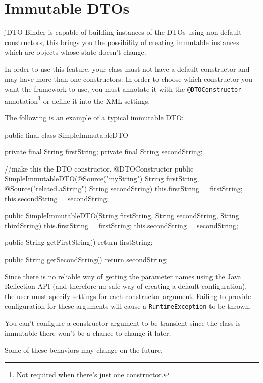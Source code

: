 \documentclass[11pt]{article}
\newcommand{\JDTO}{jDTO Binder\xspace}
\begin{document}
\section{Immutable DTOs}

\JDTO is capable of building instances of the DTOs using non default constructors, this brings you the possibility of creating immutable instances which
 are objects whose state doesn't change.
 
In order to use this feature, your class must not have a default constructor and may have more than one constructors. In order to choose which constructor you want the framework to use, you must annotate it with the \texttt{@DTOConstructor} annotation\footnote{Not required when there's just one constructor.} or define it into the XML settings.

The following is an example of a typical immutable DTO:

\begin{java}
public final class SimpleImmutableDTO {
    private final String firstString;
    private final String secondString;
    
    //make this the DTO constructor.
    @DTOConstructor
    public SimpleImmutableDTO(@Source("myString") String firstString, @Source("related.aString") String secondString) {
        this.firstString = firstString;
        this.secondString = secondString;
    }
    
    public SimpleImmutableDTO(String firstString, String secondString, String thirdString) {
        this.firstString = firstString;
        this.secondString = secondString;
    }
    
    public String getFirstString() {
        return firstString;
    }

    public String getSecondString() {
        return secondString;
    }    
}
\end{java}

Since there is no reliable way of getting the parameter names using the Java Reflection API (and therefore no safe way of creating a default configuration), the user must specify settings for each constructor argument. Failing to provide configuration for these arguments will cause a \texttt{RuntimeException} to be thrown.

You can't configure a constructor argument to be transient since the class is immutable there won't be a chance to change it later.

Some of these behaviors may change on the future.
\end{document}
